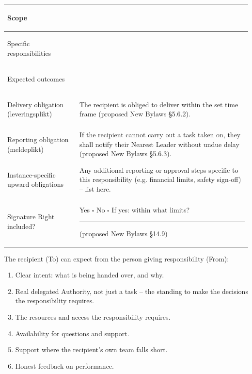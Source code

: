 \documentclass{../../../Common/Latex/Templates/rapport}
\begin{document}
\begin{tabularx}{\textwidth}{|>{\bfseries\raggedright\arraybackslash}p{4.5cm}|X|}
  \hline
  Scope                                & \rule{0pt}{1.6cm}                                                                                                                                             \\
  \hline
  Specific responsibilities            & \rule{0pt}{1.8cm}                                                                                                                                             \\
  \hline
  Expected outcomes                    & \rule{0pt}{1.6cm}                                                                                                                                             \\
  \hline
  Delivery obligation (leveringsplikt) & \rule{0pt}{1.2cm}The recipient is obliged to deliver within the set time frame (proposed New Bylaws \S5.6.2).                                                 \\
  \hline
  Reporting obligation (meldeplikt)    & \rule{0pt}{1.2cm}If the recipient cannot carry out a task taken on, they shall notify their Nearest Leader without undue delay (proposed New Bylaws \S5.6.3). \\
  \hline
  Instance-specific upward obligations & \rule{0pt}{1.6cm}Any additional reporting or approval steps specific to this responsibility (e.g. financial limits, safety sign-off) -- list here.            \\
  \hline
  Signature Right included?            & \rule{0pt}{1cm}Yes \quad $\square$ \quad\quad No \quad $\square$ \quad\quad If yes: within what limits? \rule{3cm}{0.4pt} (proposed New Bylaws \S14.9)        \\
  \hline
\end{tabularx}

The recipient (To) can expect from the person giving responsibility (From):
\begin{enumerate}
  \item Clear intent: what is being handed over, and why.
  \item Real delegated Authority, not just a task -- the standing to make the decisions the responsibility requires.
  \item The resources and access the responsibility requires.
  \item Availability for questions and support.
  \item Support where the recipient's own team falls short.
  \item Honest feedback on performance.
\end{enumerate}
\end{document}
